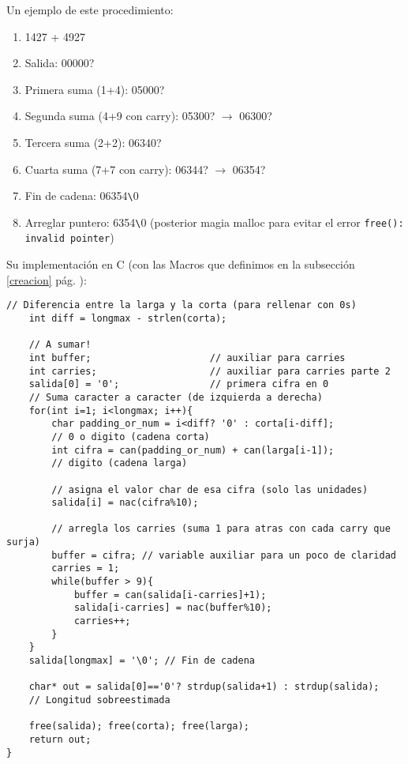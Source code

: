 \documentclass[a4paper, 12pt]{article}
\begin{document}
Un ejemplo de este procedimiento:

\begin{enumerate}
    \item 1427 + 4927
    \item Salida: 00000?
    \item Primera suma (1+4): 05000?
    \item Segunda suma (4+9 con carry): 05300? $\to$ 06300?
    \item Tercera suma (2+2): 06340?
    \item Cuarta suma (7+7 con carry): 06344? $\to$ 06354?
    \item Fin de cadena: 06354\verb|\|0
    \item Arreglar puntero: 6354\verb|\|0 (posterior magia malloc para evitar el error \texttt{free(): invalid pointer})
\end{enumerate}

Su implementación en C (con las Macros que definimos en la subsección \ref{creacion}  pág. \pageref{macros-can-nac}):

\begin{lstlisting}[style=C]
    // Diferencia entre la larga y la corta (para rellenar con 0s)
    int diff = longmax - strlen(corta);

    // A sumar!
    int buffer;                     // auxiliar para carries
    int carries;                    // auxiliar para carries parte 2
    salida[0] = '0';                // primera cifra en 0
    // Suma caracter a caracter (de izquierda a derecha)
    for(int i=1; i<longmax; i++){
        char padding_or_num = i<diff? '0' : corta[i-diff];
        // 0 o digito (cadena corta)
        int cifra = can(padding_or_num) + can(larga[i-1]);
        // digito (cadena larga)

        // asigna el valor char de esa cifra (solo las unidades)
        salida[i] = nac(cifra%10);

        // arregla los carries (suma 1 para atras con cada carry que surja)
        buffer = cifra; // variable auxiliar para un poco de claridad
        carries = 1;
        while(buffer > 9){
            buffer = can(salida[i-carries]+1);
            salida[i-carries] = nac(buffer%10);
            carries++;
        }
    }
    salida[longmax] = '\0'; // Fin de cadena

    char* out = salida[0]=='0'? strdup(salida+1) : strdup(salida);
    // Longitud sobreestimada

    free(salida); free(corta); free(larga);
    return out;
}
\end{lstlisting}
\end{document}
